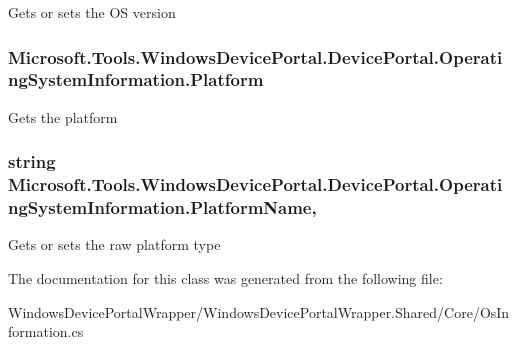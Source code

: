 Gets or sets the OS version 

\subsubsection[{\texorpdfstring{Platform}{Platform}}]{ Microsoft.\+Tools.\+Windows\+Device\+Portal.\+Device\+Portal.\+Operating\+System\+Information.\+Platform\hspace{0.3cm}{\ttfamily [get]}}\hypertarget{class_microsoft_1_1_tools_1_1_windows_device_portal_1_1_device_portal_1_1_operating_system_information_afd381ee068682a1d82ed9bb399d461bf}{}\label{class_microsoft_1_1_tools_1_1_windows_device_portal_1_1_device_portal_1_1_operating_system_information_afd381ee068682a1d82ed9bb399d461bf}


Gets the platform 

\subsubsection[{\texorpdfstring{Platform\+Name}{PlatformName}}]{\setlength{\rightskip}{0pt plus 5cm}string Microsoft.\+Tools.\+Windows\+Device\+Portal.\+Device\+Portal.\+Operating\+System\+Information.\+Platform\+Name\hspace{0.3cm}{\ttfamily [get]}, {\ttfamily [set]}}\hypertarget{class_microsoft_1_1_tools_1_1_windows_device_portal_1_1_device_portal_1_1_operating_system_information_aa060a84d320849e2572117b663e16e52}{}\label{class_microsoft_1_1_tools_1_1_windows_device_portal_1_1_device_portal_1_1_operating_system_information_aa060a84d320849e2572117b663e16e52}


Gets or sets the raw platform type 



The documentation for this class was generated from the following file\+:\begin{DoxyCompactItemize}
\item 
Windows\+Device\+Portal\+Wrapper/\+Windows\+Device\+Portal\+Wrapper.\+Shared/\+Core/Os\+Information.\+cs\end{DoxyCompactItemize}
